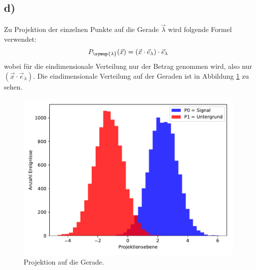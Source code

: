 \subsection{d)}
Zu Projektion der einzelnen Punkte auf die Gerade $\vec{\lambda}$ wird folgende Formel verwendet:
\begin{equation*}
  P_{\symup{\lambda}}(\vec{x}) = ( \vec{x} \cdot \vec{e}_{\lambda} ) \cdot \vec{e}_{\lambda}
\end{equation*}
wobei für die eindimensionale Verteilung nur der Betrag genommen wird, also nur $(\vec{x}\cdot \vec{e}_{\lambda})$.
Die eindimensionale Verteilung auf der Geraden ist in Abbildung \ref{abb:1} zu sehen.

\begin{figure}
  \centering
  \includegraphics[scale=0.7]{Aufgabe12/Projektionen.pdf}
  \caption{Projektion auf die Gerade.}
  \label{abb:1}
\end{figure}

